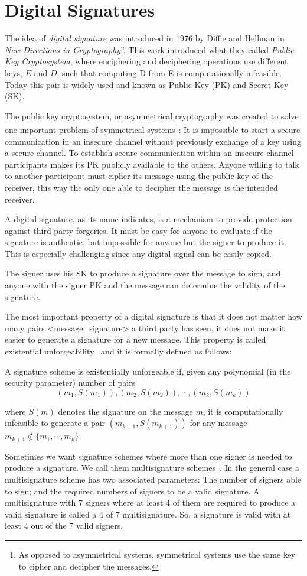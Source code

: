 \section{Digital Signatures}
The idea of \textit{digital signature} was introduced in 1976 by Diffie and
  Hellman in \textit{New Directions in Cryptography}''\cite{diffie1976new}. This work
  introduced what they called \textit{Public Key Cryptosystem}, where enciphering and
  deciphering operations use different keys, $E$ and $D$, such that computing D
  from E is computationally infeasible.
Today this pair is widely used and known as Public Key (PK) and Secret Key (SK).

The public key cryptosystem, or asymmetrical cryptography was created to solve
  one important problem of symmetrical systems\footnote{As opposed to
  asymmetrical systems, symmetrical systems use the same key to cipher and decipher
  the messages.}: It is impossible to start a secure communication in an
  insecure channel without previously exchange of a key using a secure channel.
To establish secure communication within an insecure channel participants makes
  its PK publicly available to the others.
Anyone willing to talk to another participant must cipher its message using the
  public key of the receiver, this way the only one able to decipher the message
  is the intended receiver.

A digital signature, as its name indicates, is a mechanism to provide protection
  against third party forgeries. It must be easy for anyone to evaluate if the signature is
  authentic, but impossible for anyone but the signer to produce it. This is
  especially challenging since any digital signal can be easily copied.

The signer uses his SK to produce a signature over the message to sign, and
  anyone with the signer PK and the message can determine the validity of the
  signature.

The most important property of a digital signature is that it does not matter how
  many pairs \mbox{\textless message, signature\textgreater} a third party has
  seen, it does not make it easier to generate a signature for a new
  message. This property is called existential unforgeability~\cite{dwork1994efficient}
  and it is formally defined as follows:

A signature scheme is existentially unforgeable if, given any polynomial (in the
  security parameter) number of pairs
$$ (m_{1}, S(m_{1})), (m_{2}, S(m_{2})),\cdots,(m_{k}, S(m_{k})) $$

where $S(m)$ denotes the signature on the message $m$, it is computationally
  infeasible to generate a pair $(m_{k + 1}, S(m_{k+1}))$ for any message
  $m_{k+1} \notin \{m_{1},\cdots,m_{k}\}$.

Sometimes we want signature schemes where more than one signer is needed to produce a signature.
We call them multisignature schemes~\cite{itakura1983public}.
In the general case a multisignature scheme has two associated parameters: The number
  of signers able to sign; and the required numbers of signers to be a valid
  signature.
A multisignature with 7 signers where at least 4 of them are required to produce
  a valid signature is called a 4 of 7 multisignature.
So, a signature is valid with at least 4 out of the 7 valid signers.
